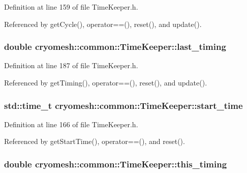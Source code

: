 \-Definition at line 159 of file \-Time\-Keeper.\-h.



\-Referenced by get\-Cycle(), operator==(), reset(), and update().

\hypertarget{classcryomesh_1_1common_1_1TimeKeeper_acb896ec81cbe9d18f4e618320353dc4f}{
\subsubsection[{last\-\_\-timing}]{\setlength{\rightskip}{0pt plus 5cm}double {\bf cryomesh\-::common\-::\-Time\-Keeper\-::last\-\_\-timing}}}\label{classcryomesh_1_1common_1_1TimeKeeper_acb896ec81cbe9d18f4e618320353dc4f}


\-Definition at line 187 of file \-Time\-Keeper.\-h.



\-Referenced by get\-Timing(), operator==(), reset(), and update().

\hypertarget{classcryomesh_1_1common_1_1TimeKeeper_ad6e92ec3c962aa3e6db82d69188e9686}{
\subsubsection[{start\-\_\-time}]{\setlength{\rightskip}{0pt plus 5cm}std\-::time\-\_\-t {\bf cryomesh\-::common\-::\-Time\-Keeper\-::start\-\_\-time}}}\label{classcryomesh_1_1common_1_1TimeKeeper_ad6e92ec3c962aa3e6db82d69188e9686}


\-Definition at line 166 of file \-Time\-Keeper.\-h.



\-Referenced by get\-Start\-Time(), operator==(), and reset().

\hypertarget{classcryomesh_1_1common_1_1TimeKeeper_afe9c0b2cd669e9d4d62718734e5b630a}{
\subsubsection[{this\-\_\-timing}]{\setlength{\rightskip}{0pt plus 5cm}double {\bf cryomesh\-::common\-::\-Time\-Keeper\-::this\-\_\-timing}}}\label{classcryomesh_1_1common_1_1TimeKeeper_afe9c0b2cd669e9d4d62718734e5b630a}


